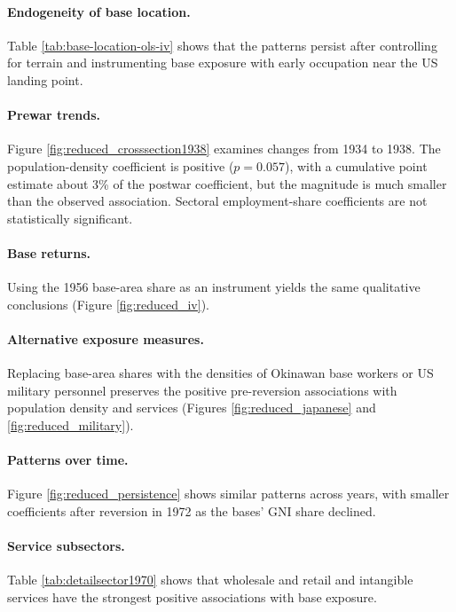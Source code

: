 \documentclass[12pt, unicode, a4paper]{article}
\newcommand{\1}{\mbox{1}\hspace{-0.25em}\mbox{l}} %
\begin{document}
\paragraph{Endogeneity of base location.} Table \ref{tab:base-location-ols-iv} shows that the patterns persist after controlling for terrain and instrumenting base exposure with early occupation near the US landing point.

\paragraph{Prewar trends.} Figure \ref{fig:reduced_crosssection1938} examines changes from 1934 to 1938. The population-density coefficient is positive ($p=0.057$), with a cumulative point estimate about 3\% of the postwar coefficient, but the magnitude is much smaller than the observed association. Sectoral employment-share coefficients are not statistically significant.

\paragraph{Base returns.} Using the 1956 base-area share as an instrument yields the same qualitative conclusions (Figure \ref{fig:reduced_iv}).

\paragraph{Alternative exposure measures.} Replacing base-area shares with the densities of Okinawan base workers or US military personnel preserves the positive pre-reversion associations with population density and services (Figures \ref{fig:reduced_japanese} and \ref{fig:reduced_military}).

\paragraph{Patterns over time.} Figure \ref{fig:reduced_persistence} shows similar patterns across years, with smaller coefficients after reversion in 1972 as the bases' GNI share declined.

\paragraph{Service subsectors.} Table \ref{tab:detailsector1970} shows that wholesale and retail and intangible services have the strongest positive associations with base exposure.
\end{document}
